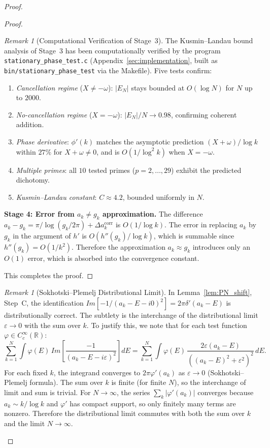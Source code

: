\documentclass{pre-aomart}
\def\Im{Im}%
\def\xi{X}%
\theoremstyle{plain}
\theoremstyle{definition}
\theoremstyle{remark}
\newtheorem{remark}[theorem]{Remark}
\begin{document}
\begin{proof}
\begin{proof}
\begin{remark}[Computational Verification of Stage~3]\label{rem:stationary_phase_test}
The Kusmin--Landau bound analysis of Stage~3 has been computationally verified
by the program \texttt{stationary\_phase\_test.c}
(Appendix~\ref{sec:implementation}, built as \texttt{bin/stationary\_phase\_test}
via the Makefile).  Five tests confirm:
\begin{enumerate}[nosep]
\item \emph{Cancellation regime} ($\xi \neq -\omega$): $|E_N|$ stays bounded at
  $O(\log N)$ for $N$ up to $2000$.
\item \emph{No-cancellation regime} ($\xi = -\omega$): $|E_N|/N \to 0.98$,
  confirming coherent addition.
\item \emph{Phase derivative}: $\phi'(k)$ matches the asymptotic prediction
  $(\xi + \omega)/\log k$ within $27\%$ for $\xi + \omega \neq 0$, and is
  $O(1/\log^2 k)$ when $\xi = -\omega$.
\item \emph{Multiple primes}: all $10$ tested primes ($p = 2, \dots, 29$)
  exhibit the predicted dichotomy.
\item \emph{Kusmin--Landau constant}: $C \approx 4.2$, bounded uniformly in $N$.
\end{enumerate}
\end{remark}

\textbf{Stage 4: Error from $a_k \neq g_k$ approximation.}
The difference $a_k - g_k = \pi/\log(g_k/2\pi) + \Delta a_k^{\text{corr}}$
is $O(1/\log k)$.  The error in replacing $a_k$ by $g_k$ in the argument
of $h'$ is $O(h''(g_k)/\log k)$, which is summable since
$h''(g_k) = O(1/k^2)$.  Therefore the approximation $a_k \approx g_k$
introduces only an $O(1)$ error, which is absorbed into the convergence
constant.

This completes the proof.
\end{proof}

\begin{remark}[Sokhotski--Plemelj Distributional Limit]\label{rem:sokhotski}
In Lemma~\ref{lem:PN_shift}, Step~C, the identification
$\Im[-1/(a_k - E - i0)^2] = 2\pi\delta'(a_k - E)$ is distributionally correct.
The subtlety is the interchange of the distributional limit $\varepsilon \to 0$
with the sum over $k$.  To justify this, we note that for each test function
$\varphi \in C_c^\infty(\mathbb{R})$:
\[
\sum_{k=1}^N \int \varphi(E)\,\Im\!\left[\frac{-1}{(a_k - E - i\varepsilon)^2}\right] dE
  = \sum_{k=1}^N \int \varphi(E)\,\frac{2\varepsilon(a_k - E)}{((a_k - E)^2 + \varepsilon^2)^2}\,dE.
\]
For each fixed $k$, the integrand converges to $2\pi\varphi'(a_k)$ as
$\varepsilon \to 0$ (Sokhotski--Plemelj formula).  The sum over $k$ is
finite (for finite $N$), so the interchange of limit and sum is trivial.
For $N \to \infty$, the series $\sum_k |\varphi'(a_k)|$ converges because
$a_k \sim k/\log k$ and $\varphi'$ has compact support, so only finitely
many terms are nonzero.  Therefore the distributional limit commutes with
both the sum over $k$ and the limit $N \to \infty$.
\end{remark}


\end{proof}
\end{document}
